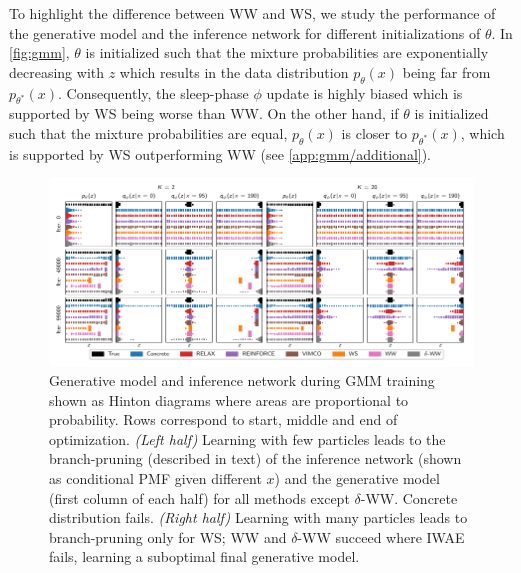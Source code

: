 To highlight the difference between \gls{WW} and \gls{WS}, we study the performance of the generative model and the inference network for different initializations of $\theta$.
In \cref{fig:gmm}, $\theta$ is initialized such that the mixture probabilities are exponentially decreasing with $z$ which results in the data distribution $p_\theta(x)$ being far from $p_{\theta^*}(x)$.
Consequently, the sleep-phase $\phi$ update is highly biased which is supported by \gls{WS} being worse than \gls{WW}.
On the other hand, if $\theta$ is initialized such that the mixture probabilities are equal, $p_\theta(x)$ is closer to $p_{\theta^*}(x)$, which is supported by \gls{WS} outperforming \gls{WW} (see \cref{app:gmm/additional}).


\begin{figure}[!ht]
  \centering
  \includegraphics[width=\textwidth]{figures/RRWS/gmm/models.pdf}
  \vspace*{-4ex}
  \caption{
    Generative model and inference network during \gls{GMM} training shown as Hinton diagrams where areas are proportional to probability.
    Rows correspond to start, middle and end of optimization.
    \emph{(Left half)}
    Learning with few particles leads to the branch-pruning (described in text) of the inference network (shown as conditional \gls{PMF} given different $x$) and the generative model (first column of each half) for all methods except $\delta$-\gls{WW}.
    Concrete distribution fails.
    \emph{(Right half)}
    Learning with many particles leads to branch-pruning only for \gls{WS}; \gls{WW} and $\delta$-\gls{WW} succeed where \gls{IWAE} fails, learning a suboptimal final generative model.
  }
  \label{fig:gmm2}
\end{figure}

